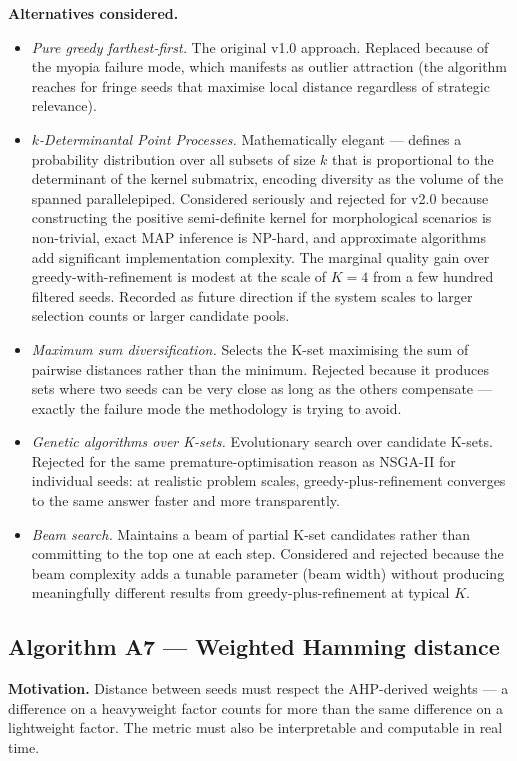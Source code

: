 \documentclass[11pt,a4paper]{article}
\begin{document}
\textbf{Alternatives considered.}

\begin{itemize}[leftmargin=*]
  \item \emph{Pure greedy farthest-first.} The original v1.0 approach. Replaced because of the myopia failure mode, which manifests as outlier attraction (the algorithm reaches for fringe seeds that maximise local distance regardless of strategic relevance).
  \item \emph{$k$-Determinantal Point Processes.} Mathematically elegant — defines a probability distribution over all subsets of size $k$ that is proportional to the determinant of the kernel submatrix, encoding diversity as the volume of the spanned parallelepiped. Considered seriously and rejected for v2.0 because constructing the positive semi-definite kernel for morphological scenarios is non-trivial, exact MAP inference is NP-hard, and approximate algorithms add significant implementation complexity. The marginal quality gain over greedy-with-refinement is modest at the scale of $K=4$ from a few hundred filtered seeds. Recorded as future direction if the system scales to larger selection counts or larger candidate pools.
  \item \emph{Maximum sum diversification.} Selects the K-set maximising the sum of pairwise distances rather than the minimum. Rejected because it produces sets where two seeds can be very close as long as the others compensate — exactly the failure mode the methodology is trying to avoid.
  \item \emph{Genetic algorithms over K-sets.} Evolutionary search over candidate K-sets. Rejected for the same premature-optimisation reason as NSGA-II for individual seeds: at realistic problem scales, greedy-plus-refinement converges to the same answer faster and more transparently.
  \item \emph{Beam search.} Maintains a beam of partial K-set candidates rather than committing to the top one at each step. Considered and rejected because the beam complexity adds a tunable parameter (beam width) without producing meaningfully different results from greedy-plus-refinement at typical $K$.
\end{itemize}

\subsection{Algorithm A7 — Weighted Hamming distance}

\textbf{Motivation.} Distance between seeds must respect the AHP-derived weights — a difference on a heavyweight factor counts for more than the same difference on a lightweight factor. The metric must also be interpretable and computable in real time.
\end{document}

